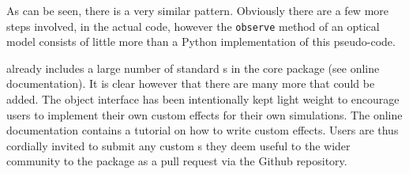 As can be seen, there is a very similar pattern.
Obviously there are a few more steps involved, in the actual \ScopeSim{} code, however the \lstinline{observe} method of an optical model consists of little more than a Python implementation of this pseudo-code.

\ScopeSim{} already includes a large number of standard \Effect{}s in the core package (see online documentation).
It is clear however that there are many more that could be added.
The \Effect{} object interface has been intentionally kept light weight to encourage users to implement their own custom effects for their own simulations.
The online documentation contains a tutorial on how to write custom effects.
Users are thus cordially invited to submit any custom \Effect{}s they deem useful to the wider community to the \ScopeSim{} package as a pull request via the Github repository.
